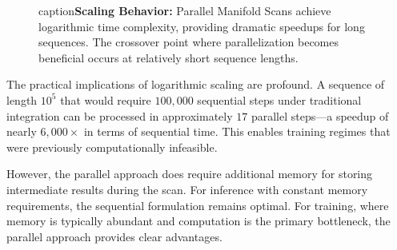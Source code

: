 \documentclass[12pt,a4paper]{article}
\begin{document}
\begin{figure}[htbp]
\centering
{}
caption{\textbf{Scaling Behavior:} Parallel Manifold Scans achieve 
         logarithmic time complexity, providing dramatic speedups for 
         long sequences. The crossover point where parallelization 
         becomes beneficial occurs at relatively short sequence lengths.}
\label{fig:scaling}
\end{figure}

The practical implications of logarithmic scaling are profound. A sequence of length $10^5$ that would require $100,000$ sequential steps under traditional integration can be processed in approximately $17$ parallel steps—a speedup of nearly $6,000\times$ in terms of sequential time. This enables training regimes that were previously computationally infeasible.

However, the parallel approach does require additional memory for storing intermediate results during the scan. For inference with constant memory requirements, the sequential formulation remains optimal. For training, where memory is typically abundant and computation is the primary bottleneck, the parallel approach provides clear advantages.
\end{document}
